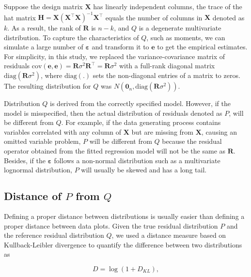 \documentclass[]{interact}
\theoremstyle{plain}%
\theoremstyle{definition}
\theoremstyle{remark}
\begin{document}
Suppose the design matrix \(\boldsymbol{X}\) has linearly independent
columns, the trace of the hat matrix
\(\boldsymbol{H} = \boldsymbol{X}(\boldsymbol{X}^\top\boldsymbol{X})^{-1}\boldsymbol{X}^\top\)
equals the number of columns in \(\boldsymbol{X}\) denoted as \(k\). As
a result, the rank of \(\boldsymbol{R}\) is \(n - k\), and \(Q\) is a
degenerate multivariate distribution. To capture the characteristics of
\(Q\), such as moments, we can simulate a large number of
\(\boldsymbol{\varepsilon}\) and transform it to \(\boldsymbol{e}\) to
get the empirical estimates. For simplicity, in this study, we replaced
the variance-covariance matrix of residuals
\(\text{cov}(\boldsymbol{e}, \boldsymbol{e}) = \boldsymbol{R}\sigma^2\boldsymbol{R}^\top = \boldsymbol{R}\sigma^2\)
with a full-rank diagonal matrix
\(\text{diag}(\boldsymbol{R}\sigma^2)\), where \(\text{diag}(.)\) sets
the non-diagonal entries of a matrix to zeros. The resulting
distribution for \(Q\) was
\(N(\boldsymbol{0}_n, \text{diag}(\boldsymbol{R}\sigma^2))\).

Distribution \(Q\) is derived from the correctly specified model.
However, if the model is misspecified, then the actual distribution of
residuals denoted as \(P\), will be different from \(Q\). For example,
if the data generating process contains variables correlated with any
column of \(\boldsymbol{X}\) but are missing from \(\boldsymbol{X}\),
causing an omitted variable problem, \(P\) will be different from \(Q\)
because the residual operator obtained from the fitted regression model
will not be the same as \(\boldsymbol{R}\). Besides, if the
\(\boldsymbol{\varepsilon}\) follows a non-normal distribution such as a
multivariate lognormal distribution, \(P\) will usually be skewed and
has a long tail.

\subsection{\texorpdfstring{Distance of \(P\) from
\(Q\)}{Distance of P from Q}}\label{distance-of-p-from-q}

Defining a proper distance between distributions is usually easier than
defining a proper distance between data plots. Given the true residual
distribution \(P\) and the reference residual distribution \(Q\), we
used a distance measure based on Kullback-Leibler divergence
\citep{kullback1951information} to quantify the difference between two
distributions as

\begin{equation} \label{eq:kl-0}
D = \log\left(1 + D_{KL}\right),
\end{equation}
\end{document}
